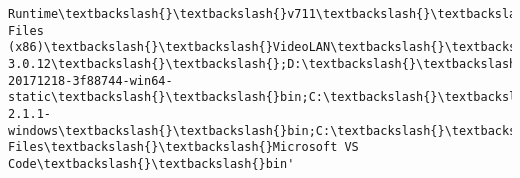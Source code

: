 \documentclass[11pt]{article}
\begin{document}
\begin{Verbatim}[commandchars=\\\{\}]
Runtime\textbackslash{}\textbackslash{}v711\textbackslash{}\textbackslash{}runtime\textbackslash{}\textbackslash{}win32;C:\textbackslash{}\textbackslash{}Users\textbackslash{}\textbackslash{}xuhao\textbackslash{}\textbackslash{}AppData\textbackslash{}\textbackslash{}Local\textbackslash{}\textbackslash{}Microsoft\textbackslash{}\textbackslash{}WindowsApps;C:\textbackslash{}\textbackslash{}Program Files (x86)\textbackslash{}\textbackslash{}VideoLAN\textbackslash{}\textbackslash{}VLC\textbackslash{}\textbackslash{};D:\textbackslash{}\textbackslash{}soft\textbackslash{}\textbackslash{}swigwin-3.0.12\textbackslash{}\textbackslash{};D:\textbackslash{}\textbackslash{}soft\textbackslash{}\textbackslash{}ffmpeg-20171218-3f88744-win64-static\textbackslash{}\textbackslash{}bin;C:\textbackslash{}\textbackslash{}Users\textbackslash{}\textbackslash{}xuhao\textbackslash{}\textbackslash{}AppData\textbackslash{}\textbackslash{}Roaming\textbackslash{}\textbackslash{}npm;D:\textbackslash{}\textbackslash{}soft\textbackslash{}\textbackslash{}phantomjs-2.1.1-windows\textbackslash{}\textbackslash{}bin;C:\textbackslash{}\textbackslash{}Users\textbackslash{}\textbackslash{}xuhao\textbackslash{}\textbackslash{}AppData\textbackslash{}\textbackslash{}Local\textbackslash{}\textbackslash{}atom\textbackslash{}\textbackslash{}bin;C:\textbackslash{}\textbackslash{}Program Files\textbackslash{}\textbackslash{}Microsoft VS Code\textbackslash{}\textbackslash{}bin'
\end{Verbatim}
            

    
    
    
    
\end{document}
